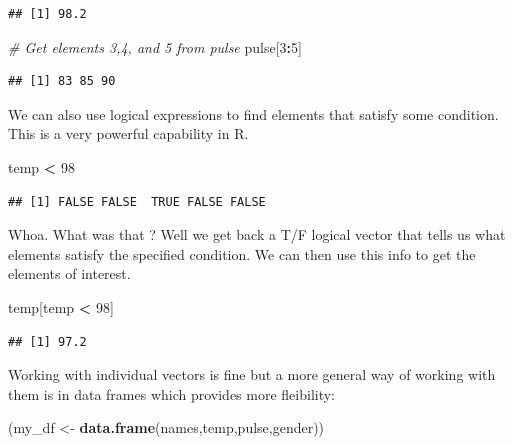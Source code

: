 \documentclass[]{book}
\newenvironment{Shaded}{\begin{snugshade}}{\end{snugshade}}
\newcommand{\CommentTok}[1]{\textcolor[rgb]{0.56,0.35,0.01}{\textit{#1}}}
\newcommand{\DecValTok}[1]{\textcolor[rgb]{0.00,0.00,0.81}{#1}}
\newcommand{\KeywordTok}[1]{\textcolor[rgb]{0.13,0.29,0.53}{\textbf{#1}}}
\newcommand{\NormalTok}[1]{#1}
\newcommand{\OperatorTok}[1]{\textcolor[rgb]{0.81,0.36,0.00}{\textbf{#1}}}
\newcommand{\StringTok}[1]{\textcolor[rgb]{0.31,0.60,0.02}{#1}}
\begin{document}
\begin{verbatim}
## [1] 98.2
\end{verbatim}

\begin{Shaded}
\begin{Highlighting}[]
\CommentTok{# Get elements 3,4, and 5 from pulse}
\NormalTok{pulse[}\DecValTok{3}\OperatorTok{:}\DecValTok{5}\NormalTok{]}
\end{Highlighting}
\end{Shaded}

\begin{verbatim}
## [1] 83 85 90
\end{verbatim}

We can also use logical expressions to find elements that satisfy some condition. This is a very powerful capability in R.

\begin{Shaded}
\begin{Highlighting}[]
\NormalTok{temp }\OperatorTok{<}\StringTok{ }\DecValTok{98}
\end{Highlighting}
\end{Shaded}

\begin{verbatim}
## [1] FALSE FALSE  TRUE FALSE FALSE
\end{verbatim}

Whoa. What was that ? Well we get back a T/F logical vector that tells us what elements satisfy the specified condition. We can then use this info to get the elements of interest.

\begin{Shaded}
\begin{Highlighting}[]
\NormalTok{temp[temp }\OperatorTok{<}\StringTok{ }\DecValTok{98}\NormalTok{]}
\end{Highlighting}
\end{Shaded}

\begin{verbatim}
## [1] 97.2
\end{verbatim}

Working with individual vectors is fine but a more general way of working with them is in data frames which provides more fleibility:

\begin{Shaded}
\begin{Highlighting}[]
\NormalTok{(my_df <-}\StringTok{ }\KeywordTok{data.frame}\NormalTok{(names,temp,pulse,gender)) }
\end{Highlighting}
\end{Shaded}
\end{document}
